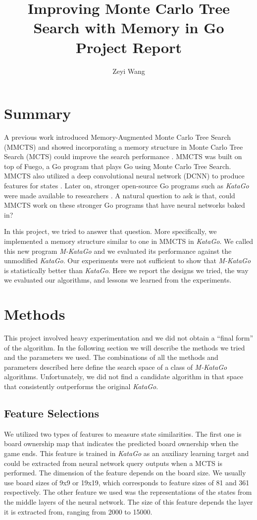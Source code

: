 \documentclass{article}
\title{
      Improving Monte Carlo Tree Search with Memory in Go \\
      Project Report
}
\author{Zeyi Wang}
\newcommand{\katago}{\emph{KataGo}\xspace}
\newcommand{\mkatago}{\emph{M-KataGo}\xspace}
\begin{document}
      \maketitle

      \section{Summary}
      A previous work introduced Memory-Augmented Monte Carlo Tree Search (MMCTS) and showed incorporating a memory structure in Monte Carlo Tree Search (MCTS) could improve the search performance \cite{xiao_memory-augmented_2018}.
      MMCTS was built on top of Fuego, a Go program that plays Go using Monte Carlo Tree Search.
      MMCTS also utilized a deep convolutional neural network (DCNN) to produce features for states \cite{clark_teaching_2014}.
      Later on, stronger open-source Go programs such as \katago were made available to researchers \cite{wu_accelerating_2020}.
      A natural question to ask is that, could MMCTS work on these stronger Go programs that have neural networks baked in?

      In this project, we tried to answer that question.
      More specifically, we implemented a memory structure similar to one in MMCTS in \katago.
      We called this new program \mkatago and we evaluated its performance against the unmodified \katago.
      Our experiments were not sufficient to show that \mkatago is statistically better than \katago.
      Here we report the designs we tried, the way we evaluated our algorithms, and lessons we learned from the experiments.

      \section{Methods}
      This project involved heavy experimentation and we did not obtain a ``final form'' of the algorithm.
      In the following section we will describe the methods we tried and the parameters we used.
      The combinations of all the methods and parameters described here define the search space of a class of \mkatago algorithms.
      Unfortunately, we did not find a candidate algorithm in that space that consistently outperforms the original \katago.

      \subsection{Feature Selections}
      We utilized two types of features to measure state similarities.
      The first one is board ownership map that indicates the predicted board ownership when the game ends.
      This feature is trained in \katago as an auxiliary learning target and could be extracted from neural network query outputs when a MCTS is performed.
      The dimension of the feature depends on the board size.
      We usually use board sizes of 9x9 or 19x19, which corresponds to feature sizes of 81 and 361 respectively.
      The other feature we used was the representations of the states from the middle layers of the neural network.
      The size of this feature depends the layer it is extracted from, ranging from 2000 to 15000.
\end{document}
